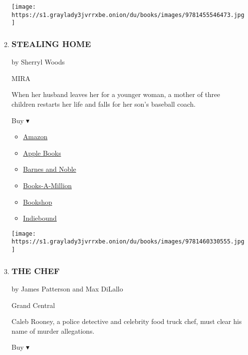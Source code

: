 \begin{enumerate}
  \texttt{[image: https://s1.graylady3jvrrxbe.onion/du/books/images/9781455546473.jpg]}
\item
  \hypertarget{stealing-home}{%
  \subsubsection{STEALING HOME}\label{stealing-home}}

  by Sherryl Woods

  MIRA

  When her husband leaves her for a younger woman, a mother of three
  children restarts her life and falls for her son's baseball coach.

  Buy ▾

  \begin{itemize}
  \tightlist
  \item
    \href{https://www.amazon.com/dp/0778316289?tag=NYTBSREV-20\&tag=NYTBS-20}{Amazon}
  \item
    \href{https://du-gae-books-dot-nyt-du-prd.appspot.com/buy?title=STEALING+HOME\&author=Sherryl+Woods}{Apple
    Books}
  \item
    \href{https://www.anrdoezrs.net/click-7990613-11819508?url=https\%3A\%2F\%2Fwww.barnesandnoble.com\%2Fw\%2F\%3Fean\%3D9781460330555}{Barnes
    and Noble}
  \item
    \href{https://www.anrdoezrs.net/click-7990613-35140?url=https\%3A\%2F\%2Fwww.booksamillion.com\%2Fp\%2FSTEALING\%2BHOME\%2FSherryl\%2BWoods\%2F9781460330555}{Books-A-Million}
  \item
    \href{https://bookshop.org/a/3546/9781460330555}{Bookshop}
  \item
    \href{https://www.indiebound.org/book/9781460330555?aff=NYT}{Indiebound}
  \end{itemize}

  \texttt{[image: https://s1.graylady3jvrrxbe.onion/du/books/images/9781460330555.jpg]}
\item
  \hypertarget{the-chef}{%
  \subsubsection{THE CHEF}\label{the-chef}}

  by James Patterson and Max DiLallo

  Grand Central

  Caleb Rooney, a police detective and celebrity food truck chef, must
  clear his name of murder allegations.

  Buy ▾


\end{enumerate}
